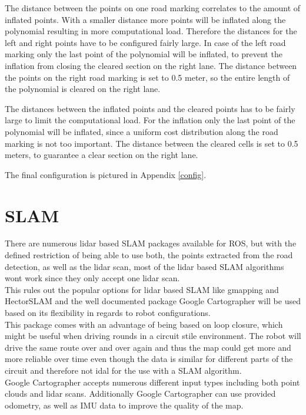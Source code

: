 The distance between the points on one road marking correlates to the amount of inflated points. With a smaller distance more points will be inflated along the polynomial resulting in more computational load. Therefore the distances for the left and right points have to be configured fairly large. In case of the left road marking only the last point of the polynomial will be inflated, to prevent the inflation from closing the cleared section on the right lane. The distance between the points on the right road marking is set to 0.5 meter, so the entire length of the polynomial is cleared on the right lane.


The distances between the inflated points and the cleared points has to be fairly large to limit the computational load. For the inflation only the last point of the polynomial will be inflated, since a uniform cost distribution along the road marking is not too important. The distance between the cleared cells is set to 0.5 meters, to guarantee a clear section on the right lane.

The final configuration is pictured in Appendix \ref{config}.



\section{SLAM}
There are numerous lidar based SLAM packages available for ROS, but with the defined restriction of being able to use both, the points extracted from the road detection, as well as the lidar scan, most of the lidar based SLAM algorithms wont work since they only accept one lidar scan.\\
This rules out the popular options for lidar based SLAM like gmapping and HectorSLAM and the well documented package Google Cartographer will be used based on its flexibility in regards to robot configurations.\\
This package comes with an advantage of being based on loop closure, which might be useful when driving rounds in a circuit stile environment. The robot will drive the same route over and over again and thus the map could get more and more reliable over time even though the data is similar for different parts of the circuit and therefore not idal for the use with a SLAM algorithm.\\

Google Cartographer accepts numerous different input types including both point clouds and lidar scans. Additionally Google Cartographer can use provided odometry, as well as IMU data to improve the quality of the map.\\



